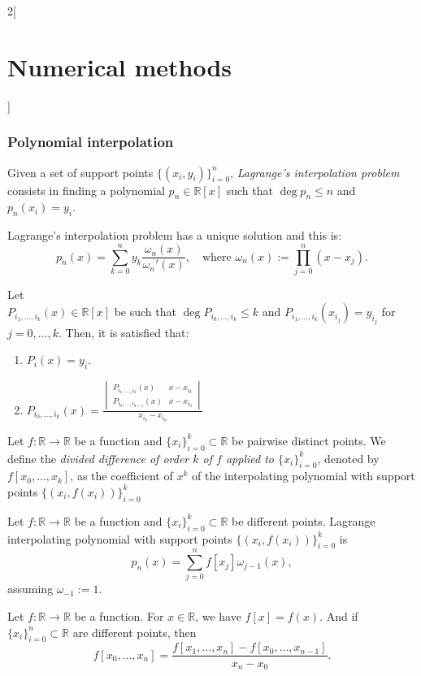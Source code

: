 \documentclass[../../../main.tex]{subfiles}
\begin{document}
\begin{multicols}{2}[\section{Numerical methods}]
\subsubsection*{Polynomial interpolation}
\begin{definition}
Given a set of support points $\{(x_i,y_i)\}_{i=0}^n$, \textit{Lagrange's interpolation problem} consists in finding a polynomial $p_n\in\mathbb{R}[x]$ such that $\deg p_n\leq n$ and $p_n(x_i)=y_i$.
\end{definition}
\begin{prop}
Lagrange's interpolation problem has a unique solution and this is: $$p_n(x)=\sum_{k=0}^ny_k\frac{\omega_n(x)}{\omega_n'(x)},\quad\text{where }\omega_n(x):=\prod_{j=0}^n(x-x_j).$$
\end{prop}
\begin{prop}
Let \\$P_{i_1,\ldots,i_k}(x)\in\mathbb{R}[x]$ be such that $\deg P_{i_0,\ldots,i_k}\leq k$ and $P_{i_1,\ldots,i_k}(x_{i_j})=y_{i_j}$ for $j=0,\ldots,k$. Then, it is satisfied that:
\begin{enumerate}
    \item $P_i(x)=y_i$.
    \item $P_{i_0,\ldots,i_k}(x)=\frac{\begin{vmatrix}
    P_{i_1,\ldots,i_k}(x) & x-x_{i_k}\\
    P_{i_0,\ldots,i_{k-1}}(x) & x-x_{i_0}
    \end{vmatrix}}{x_{i_k}-x_{i_0}}$
\end{enumerate}
\end{prop}
\begin{definition}
Let $f:\mathbb{R}\rightarrow\mathbb{R}$ be a function and $\{x_i\}_{i=0}^k\subset\mathbb{R}$ be pairwise distinct points. We define the \textit{divided difference of order $k$ of $f$ applied to $\{x_i\}_{i=0}^k$}, denoted by $f[x_0,\ldots,x_k]$, as the coefficient of $x^k$ of the interpolating polynomial with support points $\{(x_i,f(x_i))\}_{i=0}^k$ 
\end{definition}
\begin{prop}
Let $f:\mathbb{R}\rightarrow\mathbb{R}$ be a function and $\{x_i\}_{i=0}^k\subset\mathbb{R}$ be different points. Lagrange interpolating polynomial with support points $\{(x_i,f(x_i))\}_{i=0}^k$ is $$p_n(x)=\sum_{j=0}^nf[x_j]\omega_{j-1}(x),$$ assuming $\omega_{-1}:=1$.
\end{prop}
\begin{prop}
Let $f:\mathbb{R}\rightarrow\mathbb{R}$ be a function. For $x\in\mathbb{R}$, we have $f[x]=f(x)$. And if $\{x_i\}_{i=0}^n\subset\mathbb{R}$ are different points, then $$f[x_0,\ldots,x_n]=\frac{f[x_1,\ldots,x_n]-f[x_0,\ldots,x_{n-1}]}{x_n-x_0}.$$ 

\end{prop}
\end{multicols}
\end{document}

